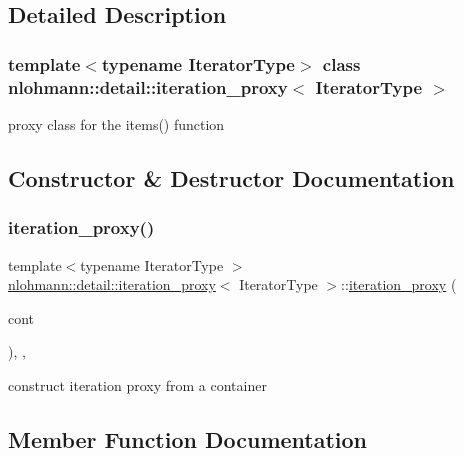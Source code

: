 \subsection{Detailed Description}
\subsubsection*{template$<$typename Iterator\+Type$>$\newline
class nlohmann\+::detail\+::iteration\+\_\+proxy$<$ Iterator\+Type $>$}

proxy class for the items() function 

\subsection{Constructor \& Destructor Documentation}
\mbox{\label{classnlohmann_1_1detail_1_1iteration__proxy_afe257e972e3b4658ef2e355f7389d4a5}} 
\subsubsection{\texorpdfstring{iteration\_proxy()}{iteration\_proxy()}}
{\footnotesize\ttfamily template$<$typename Iterator\+Type $>$ \\
\mbox{\hyperlink{classnlohmann_1_1detail_1_1iteration__proxy}{nlohmann\+::detail\+::iteration\+\_\+proxy}}$<$ Iterator\+Type $>$\+::\mbox{\hyperlink{classnlohmann_1_1detail_1_1iteration__proxy}{iteration\+\_\+proxy}} (\begin{DoxyParamCaption}\item[{typename Iterator\+Type\+::reference}]{cont }\end{DoxyParamCaption})\hspace{0.3cm}{\ttfamily [inline]}, {\ttfamily [explicit]}, {\ttfamily [noexcept]}}



construct iteration proxy from a container 



\subsection{Member Function Documentation}
\mbox{\label{classnlohmann_1_1detail_1_1iteration__proxy_a379f86709d340c4ab1995539b8af623d}} 
